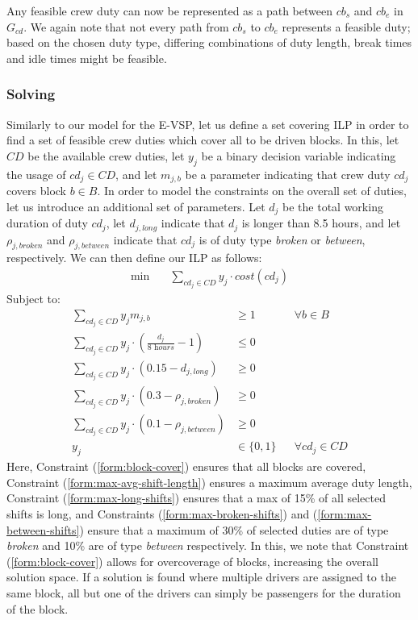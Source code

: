 \documentclass[]{article}
\begin{document}
Any feasible crew duty can now be represented as a path between $cb_s$ and $cb_e$ in $G_{cd}$. We again note that not every path from $cb_s$ to $cb_e$ represents a feasible duty; based on the chosen duty type, differing combinations of duty length, break times and idle times might be feasible.   
\subsubsection{Solving}
Similarly to our model for the E-VSP, let us define a set covering ILP in order to find a set of feasible crew duties which cover all to be driven blocks. In this, let $\textit{CD}$ be the available crew duties, let $y_j$ be a binary decision variable indicating the usage of $cd_j \in \textit{CD}$, and let $m_{j,b}$ be a parameter indicating that crew duty $cd_j$ covers block $b \in B$. In order to model the constraints on the overall set of duties, let us introduce an additional set of parameters. Let $d_j$ be the total working duration of duty $cd_j$, let $d_{j,\textit{long}}$ indicate that $d_j$ is longer than 8.5 hours, and let $\rho_{j,\textit{broken}}$ and $\rho_{j,\textit{between}}$ indicate that $cd_j$ is of duty type \textit{broken} or \textit{between}, respectively. We can then define our ILP as follows:
\begin{align}
\min \quad
& \sum_{cd_j \in \textit{CD}} y_{j} \cdot cost(cd_j)
\end{align}
Subject to:
\begin{align}
\sum_{cd_j \in \textit{CD}} y_{j}m_{j,b} &\geq 1 && \forall b \in B \label{form:block-cover}\\
\sum_{cd_j \in \textit{CD}} y_{j} \cdot (\frac{d_{j}}{\textit{8 hours}} - 1) &\leq 0 && \label{form:max-avg-shift-length}\\
\sum_{cd_j \in \textit{CD}} y_{j} \cdot (0.15 - d_{j,\textit{long}}) &\geq 0 && \label{form:max-long-shifts}\\
\sum_{cd_j \in \textit{CD}} y_{j} \cdot (0.3 - \rho_{j,\textit{broken}}) &\geq 0 && \label{form:max-broken-shifts}\\
\sum_{cd_j \in \textit{CD}} y_{j} \cdot (0.1 - \rho_{j,\textit{between}}) &\geq 0 && \label{form:max-between-shifts}\\
y_{j} &\in \{ 0, 1 \} && \forall cd_j \in \textit{CD} \label{form:y-integer}
\end{align}
Here, Constraint (\ref{form:block-cover}) ensures that all blocks are covered, Constraint (\ref{form:max-avg-shift-length}) ensures a maximum average duty length, Constraint (\ref{form:max-long-shifts}) ensures that a max of 15\% of all selected shifts is long, and Constraints (\ref{form:max-broken-shifts}) and (\ref{form:max-between-shifts}) ensure that a maximum of 30\% of selected duties are of type \textit{broken} and 10\% are of type \textit{between} respectively. In this, we note that Constraint (\ref{form:block-cover}) allows for overcoverage of blocks, increasing the overall solution space. If a solution is found where multiple drivers are assigned to the same block, all but one of the drivers can simply be passengers for the duration of the block. 
\end{document}
